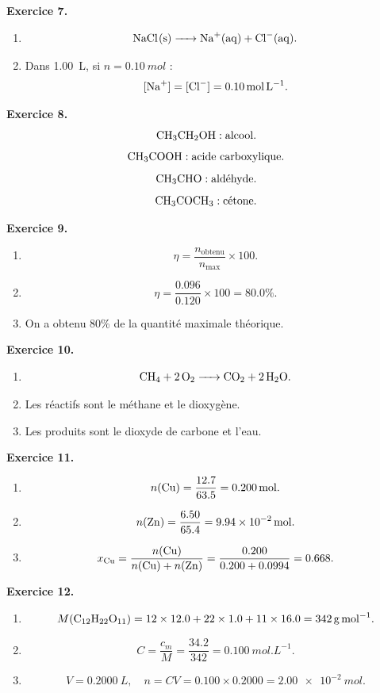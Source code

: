 \documentclass[11pt,a4paper]{article}
\newcommand{\corr}[2]{
  \begin{correctionbox}
  \textbf{Exercice #1.} #2
  \end{correctionbox}
}
\begin{document}
\corr{7}{
\begin{enumerate}
  \item
  \[
  \ce{NaCl(s) -> Na+(aq) + Cl-(aq)}.
  \]
  \item Dans \SI{1.00}{L}, si $n=\SI{0.10}{mol}$ :
  \[
  [\ce{Na+}]=[\ce{Cl-}]=\SI{0.10}{mol.L^{-1}}.
  \]
\end{enumerate}
}

\corr{8}{
\[
\ce{CH3CH2OH} : \text{alcool}.
\]
\[
\ce{CH3COOH} : \text{acide carboxylique}.
\]
\[
\ce{CH3CHO} : \text{aldéhyde}.
\]
\[
\ce{CH3COCH3} : \text{cétone}.
\]
}

\corr{9}{
\begin{enumerate}
  \item
  \[
  \eta=\frac{n_{\text{obtenu}}}{n_{\max}}\times 100.
  \]
  \item
  \[
  \eta=\frac{0.096}{0.120}\times 100=80.0\%.
  \]
  \item On a obtenu 80\% de la quantité maximale théorique.
\end{enumerate}
}

\corr{10}{
\begin{enumerate}
  \item
  \[
  \ce{CH4 + 2O2 -> CO2 + 2H2O}.
  \]
  \item Les réactifs sont le méthane et le dioxygène.
  \item Les produits sont le dioxyde de carbone et l'eau.
\end{enumerate}
}

\corr{11}{
\begin{enumerate}
  \item
  \[
  n(\ce{Cu})=\frac{12.7}{63.5}=\SI{0.200}{mol}.
  \]
  \item
  \[
  n(\ce{Zn})=\frac{6.50}{65.4}=\SI{9.94e-2}{mol}.
  \]
  \item
  \[
  x_{\ce{Cu}}=\frac{n(\ce{Cu})}{n(\ce{Cu})+n(\ce{Zn})}
  =\frac{0.200}{0.200+0.0994}=0.668.
  \]
\end{enumerate}
}

\corr{12}{
\begin{enumerate}
  \item
  \[
  M(\ce{C12H22O11})=12\times 12.0+22\times 1.0+11\times 16.0=\SI{342}{g.mol^{-1}}.
  \]
  \item
  \[
  C=\frac{c_m}{M}=\frac{34.2}{342}=\SI{0.100}{mol.L^{-1}}.
  \]
  \item
  \[
  V=\SI{0.2000}{L},\quad n=CV=0.100\times 0.2000=\SI{2.00e-2}{mol}.
  \]
\end{enumerate}
}
\end{document}
